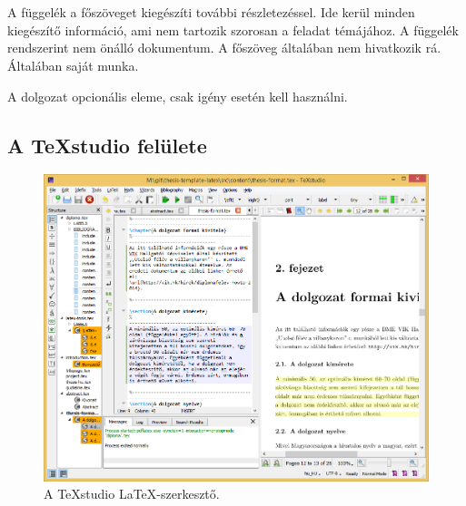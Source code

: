 \appendix
\chapter*{\fuggelek}
\setcounter{chapter}{\appendixnumber} %


A függelék a főszöveget kiegészíti további részletezéssel. Ide kerül minden kiegészítő információ, ami nem tartozik szorosan a feladat témájához. A függelék rendszerint nem önálló dokumentum. A főszöveg általában nem hivatkozik rá. Általában saját munka.

A dolgozat opcionális eleme, csak igény esetén kell használni.

\section{A TeXstudio felülete}
\begin{figure}[!ht]
\centering
\includegraphics[width=150mm, keepaspectratio]{figures/TeXstudio.png}
\caption{A TeXstudio \LaTeX-szerkesztő.} 
\end{figure}

